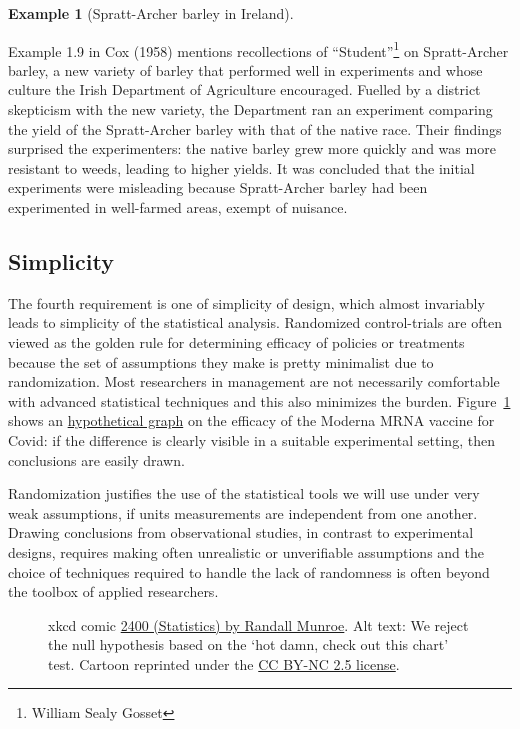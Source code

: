 \documentclass[
  11pt,
  letterpaper,
]{scrbook}
\theoremstyle{definition}
\theoremstyle{definition}
\newtheorem{example}{Example}[chapter]
\theoremstyle{remark}
\begin{document}
\begin{example}[Spratt-Archer barley in
Ireland]\protect\hypertarget{exm-spratt}{}\label{exm-spratt}

Example 1.9 in Cox (1958) mentions recollections of
``Student''\footnote{William Sealy Gosset} on Spratt-Archer barley, a
new variety of barley that performed well in experiments and whose
culture the Irish Department of Agriculture encouraged. Fuelled by a
district skepticism with the new variety, the Department ran an
experiment comparing the yield of the Spratt-Archer barley with that of
the native race. Their findings surprised the experimenters: the native
barley grew more quickly and was more resistant to weeds, leading to
higher yields. It was concluded that the initial experiments were
misleading because Spratt-Archer barley had been experimented in
well-farmed areas, exempt of nuisance.

\end{example}

\subsection{Simplicity}\label{simplicity}

The fourth requirement is one of simplicity of design, which almost
invariably leads to simplicity of the statistical analysis. Randomized
control-trials are often viewed as the golden rule for determining
efficacy of policies or treatments because the set of assumptions they
make is pretty minimalist due to randomization. Most researchers in
management are not necessarily comfortable with advanced statistical
techniques and this also minimizes the burden. Figure~\ref{fig-xkcd2400}
shows an
\href{https://www.zq1.de/~bernhard/images/share/mRNA-1273-trial.png}{hypothetical
graph} on the efficacy of the Moderna MRNA vaccine for Covid: if the
difference is clearly visible in a suitable experimental setting, then
conclusions are easily drawn.

Randomization justifies the use of the statistical tools we will use
under very weak assumptions, if units measurements are independent from
one another. Drawing conclusions from observational studies, in contrast
to experimental designs, requires making often unrealistic or
unverifiable assumptions and the choice of techniques required to handle
the lack of randomness is often beyond the toolbox of applied
researchers.

\begin{figure}[ht!]


\caption{\label{fig-xkcd2400}xkcd comic
\href{https://xkcd.com/2400/}{2400 (Statistics) by Randall Munroe}. Alt
text: We reject the null hypothesis based on the `hot damn, check out
this chart' test. Cartoon reprinted under the
\href{https://creativecommons.org/licenses/by-nc/2.5/}{CC BY-NC 2.5
license}.}

\end{figure}%
\end{document}
